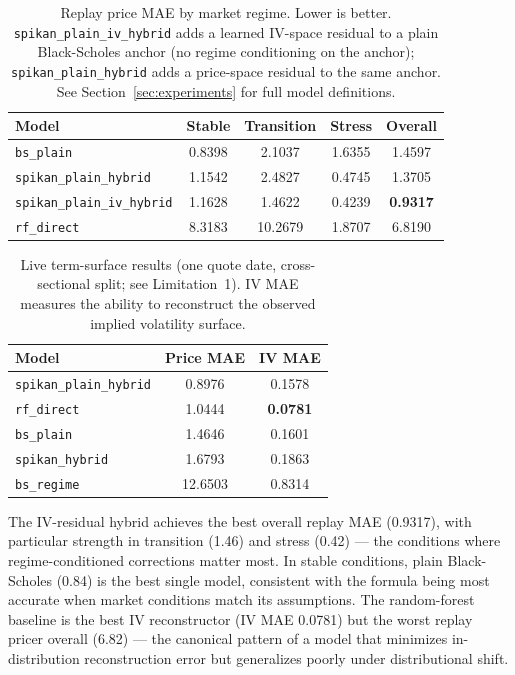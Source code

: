 \documentclass[11pt,a4paper]{article}
\begin{document}
\begin{table}[ht]
\centering
\caption{Replay price MAE by market regime. Lower is better. \texttt{spikan\_plain\_iv\_hybrid}
adds a learned IV-space residual to a plain Black-Scholes anchor (no regime conditioning
on the anchor); \texttt{spikan\_plain\_hybrid} adds a price-space residual to the same
anchor. See Section~\ref{sec:experiments} for full model definitions.}
\begin{tabular}{@{}lcccc@{}}
\toprule
Model & Stable & Transition & Stress & Overall \\ \midrule
\texttt{bs\_plain} & 0.8398 & 2.1037 & 1.6355 & 1.4597 \\
\texttt{spikan\_plain\_hybrid} & 1.1542 & 2.4827 & 0.4745 & 1.3705 \\
\texttt{spikan\_plain\_iv\_hybrid} & 1.1628 & 1.4622 & 0.4239 & \textbf{0.9317} \\
\texttt{rf\_direct} & 8.3183 & 10.2679 & 1.8707 & 6.8190 \\
\bottomrule
\end{tabular}
\label{tab:replay}
\end{table}

\begin{table}[ht]
\centering
\caption{Live term-surface results (one quote date, cross-sectional split; see
Limitation~1). IV MAE measures the ability to reconstruct the observed implied
volatility surface.}
\begin{tabular}{@{}lcc@{}}
\toprule
Model & Price MAE & IV MAE \\ \midrule
\texttt{spikan\_plain\_hybrid} & 0.8976 & 0.1578 \\
\texttt{rf\_direct} & 1.0444 & \textbf{0.0781} \\
\texttt{bs\_plain} & 1.4646 & 0.1601 \\
\texttt{spikan\_hybrid} & 1.6793 & 0.1863 \\
\texttt{bs\_regime} & 12.6503 & 0.8314 \\ \bottomrule
\end{tabular}
\label{tab:live}
\end{table}

The IV-residual hybrid achieves the best overall replay MAE (0.9317), with particular
strength in transition (1.46) and stress (0.42) --- the conditions where regime-conditioned
corrections matter most. In stable conditions, plain Black-Scholes (0.84) is the best
single model, consistent with the formula being most accurate when market conditions
match its assumptions. The random-forest baseline is the best IV reconstructor (IV
MAE 0.0781) but the worst replay pricer overall (6.82) --- the canonical pattern of a
model that minimizes in-distribution reconstruction error but generalizes poorly under
distributional shift.
\end{document}
